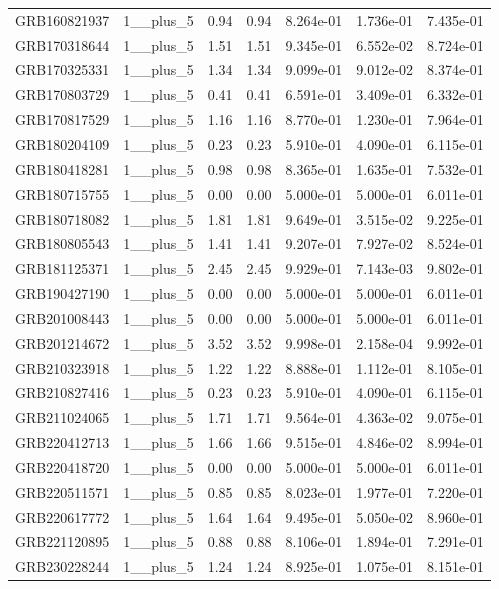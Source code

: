 \documentclass[12pt]{article}
\begin{document}
\begin{table}[h!]
{\begin{tabular}{l c c c c c c}
GRB160821937 & 1__plus_5 & 0.94 & 0.94 & 8.264e-01 & 1.736e-01 & 7.435e-01 \\
GRB170318644 & 1__plus_5 & 1.51 & 1.51 & 9.345e-01 & 6.552e-02 & 8.724e-01 \\
GRB170325331 & 1__plus_5 & 1.34 & 1.34 & 9.099e-01 & 9.012e-02 & 8.374e-01 \\
GRB170803729 & 1__plus_5 & 0.41 & 0.41 & 6.591e-01 & 3.409e-01 & 6.332e-01 \\
GRB170817529 & 1__plus_5 & 1.16 & 1.16 & 8.770e-01 & 1.230e-01 & 7.964e-01 \\
GRB180204109 & 1__plus_5 & 0.23 & 0.23 & 5.910e-01 & 4.090e-01 & 6.115e-01 \\
GRB180418281 & 1__plus_5 & 0.98 & 0.98 & 8.365e-01 & 1.635e-01 & 7.532e-01 \\
GRB180715755 & 1__plus_5 & 0.00 & 0.00 & 5.000e-01 & 5.000e-01 & 6.011e-01 \\
GRB180718082 & 1__plus_5 & 1.81 & 1.81 & 9.649e-01 & 3.515e-02 & 9.225e-01 \\
GRB180805543 & 1__plus_5 & 1.41 & 1.41 & 9.207e-01 & 7.927e-02 & 8.524e-01 \\
GRB181125371 & 1__plus_5 & 2.45 & 2.45 & 9.929e-01 & 7.143e-03 & 9.802e-01 \\
GRB190427190 & 1__plus_5 & 0.00 & 0.00 & 5.000e-01 & 5.000e-01 & 6.011e-01 \\
GRB201008443 & 1__plus_5 & 0.00 & 0.00 & 5.000e-01 & 5.000e-01 & 6.011e-01 \\
GRB201214672 & 1__plus_5 & 3.52 & 3.52 & 9.998e-01 & 2.158e-04 & 9.992e-01 \\
GRB210323918 & 1__plus_5 & 1.22 & 1.22 & 8.888e-01 & 1.112e-01 & 8.105e-01 \\
GRB210827416 & 1__plus_5 & 0.23 & 0.23 & 5.910e-01 & 4.090e-01 & 6.115e-01 \\
GRB211024065 & 1__plus_5 & 1.71 & 1.71 & 9.564e-01 & 4.363e-02 & 9.075e-01 \\
GRB220412713 & 1__plus_5 & 1.66 & 1.66 & 9.515e-01 & 4.846e-02 & 8.994e-01 \\
GRB220418720 & 1__plus_5 & 0.00 & 0.00 & 5.000e-01 & 5.000e-01 & 6.011e-01 \\
GRB220511571 & 1__plus_5 & 0.85 & 0.85 & 8.023e-01 & 1.977e-01 & 7.220e-01 \\
GRB220617772 & 1__plus_5 & 1.64 & 1.64 & 9.495e-01 & 5.050e-02 & 8.960e-01 \\
GRB221120895 & 1__plus_5 & 0.88 & 0.88 & 8.106e-01 & 1.894e-01 & 7.291e-01 \\
GRB230228244 & 1__plus_5 & 1.24 & 1.24 & 8.925e-01 & 1.075e-01 & 8.151e-01 \\

\end{tabular}}
\end{table}
\end{document}
